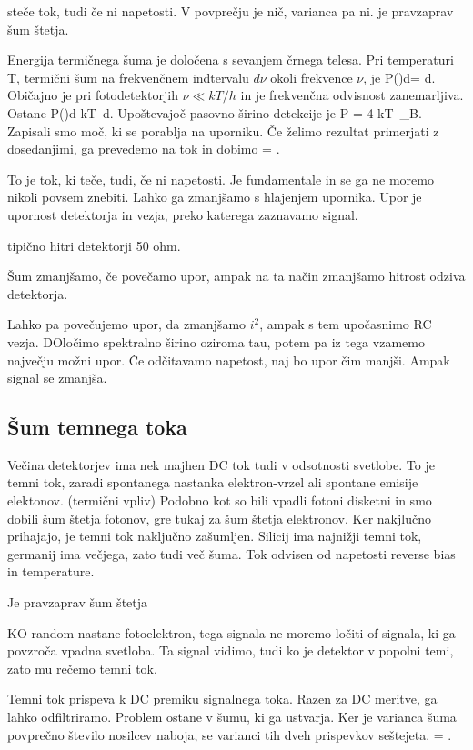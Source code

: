 steče tok, tudi če ni napetosti. V povprečju je nič, varianca pa ni.
je pravzaprav šum štetja. 

Energija termičnega šuma je določena s sevanjem črnega telesa. Pri temperaturi T, 
termični šum na frekvenčnem indtervalu $d\nu$ okoli frekvence $\nu$,
je
\beq
P(\nu)d\nu = d\nu.
\eeq
Običajno je pri fotodetektorjih $\nu\ll kT/h$ in je frekvenčna odvisnost zanemarljiva. 
Ostane 
\beq
P(\nu)d\nu {} kT\, d\nu.
\eeq
Upoštevajoč pasovno širino detekcije je
\beq
P = 4 kT\, \Delta\nu_B.
\eeq
Zapisali smo moč, ki se porablja na uporniku. Če želimo rezultat primerjati z
dosedanjimi, ga prevedemo na tok in dobimo
\beq
{} = .
\eeq

To je tok, ki teče, tudi, če ni napetosti. 
Je fundamentale in se ga ne moremo nikoli povsem znebiti. Lahko ga zmanjšamo 
s hlajenjem upornika. 
Upor je upornost detektorja in vezja, preko katerega zaznavamo signal. 

tipično hitri detektorji 50 ohm. 

Šum zmanjšamo, če povečamo upor, ampak na ta način zmanjšamo hitrost odziva detektorja. 

Lahko pa povečujemo upor, da zmanjšamo $i^2$, ampak s tem upočasnimo RC vezja. 
DOločimo spektralno širino oziroma tau, potem pa iz tega vzamemo največju možni  upor. 
Če odčitavamo napetost, naj bo upor čim manjši. Ampak signal se zmanjša. 

\subsection*{Šum temnega toka} 
Večina detektorjev ima nek majhen DC tok tudi v odsotnosti svetlobe. 
To je temni tok, zaradi spontanega nastanka elektron-vrzel ali spontane emisije elektonov.
(termični vpliv)
Podobno kot so bili vpadli fotoni disketni in smo dobili šum štetja fotonov, gre tukaj
za šum štetja elektronov. Ker nakjlučno prihajajo, je temni tok naključno zašumljen. Silicij 
ima najnižji temni tok, germanij ima večjega, zato tudi več šuma. Tok odvisen od napetosti
reverse bias in temperature.

Je pravzaprav šum štetja

KO random nastane fotoelektron, tega signala ne moremo ločiti of signala, ki ga povzroča
vpadna svetloba. Ta signal vidimo, tudi ko je detektor v popolni temi, zato mu rečemo
temni tok. 

Temni tok prispeva k DC premiku signalnega toka. Razen za DC meritve, ga lahko odfiltriramo.
Problem ostane v šumu, ki ga ustvarja. Ker je varianca šuma povprečno število nosilcev
 naboja, se varianci tih dveh prispevkov seštejeta. 
\beq
{} = .
\eeq

